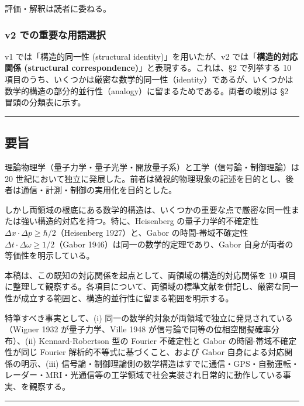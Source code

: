 \documentclass[
]{ltjsarticle}
\begin{document}
評価・解釈は読者に委ねる。

\subsubsection{v2
での重要な用語選択}\label{v2-ux3067ux306eux91cdux8981ux306aux7528ux8a9eux9078ux629e}

v1 では「構造的同一性 (structural identity)」を用いたが、v2
では「\textbf{構造的対応関係 (structural
correspondence)}」と表現する。これは、§2 で列挙する 10
項目のうち、いくつかは厳密な数学的同一性（identity）であるが、いくつかは数学的構造の部分的並行性（analogy）に留まるためである。両者の峻別は
§2 冒頭の分類表に示す。

\begin{center}\rule{0.5\linewidth}{0.5pt}\end{center}

\subsection{要旨}\label{ux8981ux65e8}

理論物理学（量子力学・量子光学・開放量子系）と工学（信号論・制御理論）は
20
世紀において独立に発展した。前者は微視的物理現象の記述を目的とし、後者は通信・計測・制御の実用化を目的とした。

しかし両領域の根底にある数学的構造は、いくつかの重要な点で厳密な同一性または強い構造的対応を持つ。特に、Heisenberg
の量子力学的不確定性
\(\Delta x \cdot \Delta p \geq \hbar/2\)（Heisenberg 1927）と、Gabor
の時間-帯域不確定性 \(\Delta t \cdot \Delta \omega \geq 1/2\)（Gabor
1946）は同一の数学的定理であり、Gabor 自身が両者の等価性を明示している。

本稿は、この既知の対応関係を起点として、両領域の構造的対応関係を 10
項目に整理して観察する。各項目について、両領域の標準文献を併記し、厳密な同一性が成立する範囲と、構造的並行性に留まる範囲を明示する。

特筆すべき事実として、(i)
同一の数学的対象が両領域で独立に発見されている（Wigner 1932
が量子力学、Ville 1948 が信号論で同等の位相空間擬確率分布）、(ii)
Kennard-Robertson 型の Fourier 不確定性と Gabor
の時間-帯域不確定性が同じ Fourier 解析的不等式に基づくこと、および Gabor
自身による対応関係の明示、(iii)
信号論・制御理論側の数学構造はすでに通信・GPS・自動運転・レーダー・MRI・光通信等の工学領域で社会実装され日常的に動作している事実、を観察する。

\begin{center}\rule{0.5\linewidth}{0.5pt}\end{center}
\end{document}
